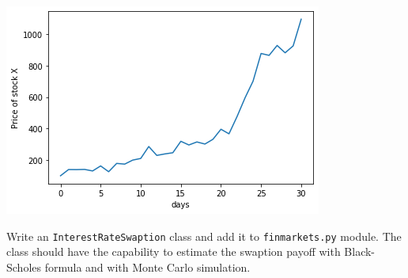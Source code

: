 \begin{Answer}
\begin{center}
  \includegraphics{lesson6_solutions_5_0.png}
\end{center}
\end{Answer}


\begin{Exercise}[title={(\texttt{InterestRateSwaption} class)}]
Write an \texttt{InterestRateSwaption} class and add it to \texttt{finmarkets.py} module. The class should have the capability to estimate the swaption payoff with Black-Scholes formula and with Monte Carlo simulation.
\end{Exercise}

